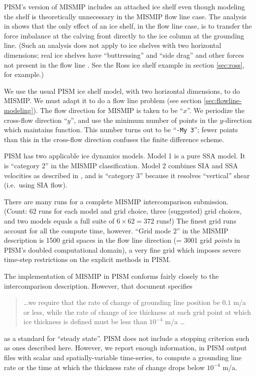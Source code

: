PISM's version of MISMIP includes an attached ice shelf even though modeling the shelf is theoretically unnecessary in the MISMIP flow line case.  The analysis in \cite{SchoofMarine1} shows that the only effect of an ice shelf, in the flow line case, is to transfer the force imbalance at the calving front directly to the ice column at the grounding line.  (Such an analysis does not apply to ice shelves with two horizontal dimensions; real ice shelves have ``buttressing'' and ``side drag'' and other forces not present in the flow line \cite{Goldbergetal2009}.  See the Ross ice shelf example in section \ref{sec:ross}, for example.)

We use the usual PISM ice shelf model, with two horizontal dimensions, to do MISMIP.  We must adapt it to do a flow line problem (see section \ref{sec:flowline-modeling}).  The flow direction for MISMIP is taken to be ``$x$''.  We periodize the cross-flow direction ``$y$'', and use the minimum number of points in the $y$-direction which maintains function.  This number turns out to be ``\texttt{-My 3}''; fewer points than this in the cross-flow direction confuses the finite difference scheme.

PISM has two applicable ice dynamics models. Model 1 is a pure SSA model.  It is ``category 2'' in the MISMIP classification.  Model 2 combines SIA and SSA velocities as described in \cite{Winkelmannetal2011}, and is ``category 3'' because it resolves ``vertical'' shear (i.e.~using SIA flow).

There are many runs for a complete MISMIP intercomparison submission.  (Count: $62$ runs for each model and grid choice, three (suggested) grid choices, and two models equals a full suite of $6 \times 62 = 372$ runs!)  The finest grid runs account for all the compute time, however.  ``Grid mode 2'' in the MISMIP description is 1500 grid spaces in the flow line direction (= 3001 grid \emph{points} in PISM's doubled computational domain), a very fine grid which imposes severe time-step restrictions on the explicit methods in PISM.

The implementation of MISMIP in PISM conforms fairly closely to the intercomparison description.  However, that document specifies
\begin{quotation}
\dots we require that the rate of change of grounding line position be $0.1$ m/a or less, while the rate of change of ice thickness at each grid point at which ice thickness is defined must be less than $10^{-4}$ m/a \dots
\end{quotation}
as a standard for ``steady state''. PISM does not include a stopping criterion such as ones described here. However, we report enough information, in PISM output files with scalar and spatially-variable time-series, to compute a grounding line rate or the time at which the thickness rate of change drops below $10^{-4}$ m/a.

